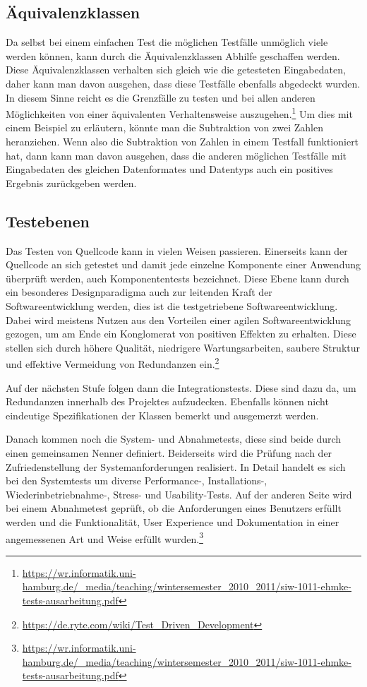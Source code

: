 \subsection{Äquivalenzklassen}
Da selbst bei einem einfachen Test die möglichen Testfälle unmöglich viele werden können, kann durch die Äquivalenzklassen Abhilfe geschaffen werden.
Diese Äquivalenzklassen verhalten sich gleich wie die getesteten Eingabedaten, daher kann man davon ausgehen, dass diese Testfälle ebenfalls abgedeckt wurden.
In diesem Sinne reicht es die Grenzfälle zu testen und bei allen anderen Möglichkeiten von einer äquivalenten Verhaltensweise auszugehen.\footnote{\url{https://wr.informatik.uni-hamburg.de/_media/teaching/wintersemester_2010_2011/siw-1011-ehmke-tests-ausarbeitung.pdf}}
Um dies mit einem Beispiel zu erläutern, könnte man die Subtraktion von zwei Zahlen heranziehen.
Wenn also die Subtraktion von Zahlen in einem Testfall funktioniert hat, dann kann man davon ausgehen, dass die anderen möglichen Testfälle mit Eingabedaten des gleichen Datenformates und Datentyps auch ein positives Ergebnis zurückgeben werden.

\subsection{Testebenen}
Das Testen von Quellcode kann in vielen Weisen passieren.
Einerseits kann der Quellcode an sich getestet und damit jede einzelne Komponente einer Anwendung überprüft werden, auch Komponententests bezeichnet.
Diese Ebene kann durch ein besonderes Designparadigma auch zur leitenden Kraft der Softwareentwicklung werden, dies ist die testgetriebene Softwareentwicklung.
Dabei wird meistens Nutzen aus den Vorteilen einer agilen Softwareentwicklung gezogen, um am Ende ein Konglomerat von positiven Effekten zu erhalten.
Diese stellen sich durch höhere Qualität, niedrigere Wartungsarbeiten, saubere Struktur und effektive Vermeidung von Redundanzen ein.\footnote{\url{https://de.ryte.com/wiki/Test_Driven_Development}}

Auf der nächsten Stufe folgen dann die Integrationstests. Diese sind dazu da, um Redundanzen innerhalb des Projektes aufzudecken.
Ebenfalls können nicht eindeutige Spezifikationen der Klassen bemerkt und ausgemerzt werden.

Danach kommen noch die System- und Abnahmetests, diese sind beide durch einen gemeinsamen Nenner definiert.
Beiderseits wird die Prüfung nach der Zufriedenstellung der Systemanforderungen realisiert.
In Detail handelt es sich bei den Systemtests um diverse Performance-, Installations-, Wiederinbetriebnahme-, Stress- und Usability-Tests.
Auf der anderen Seite wird bei einem Abnahmetest geprüft, ob die Anforderungen eines Benutzers erfüllt werden und die Funktionalität, User Experience und Dokumentation in einer angemessenen Art und Weise erfüllt wurden.\footnote{\url{https://wr.informatik.uni-hamburg.de/_media/teaching/wintersemester_2010_2011/siw-1011-ehmke-tests-ausarbeitung.pdf}}

